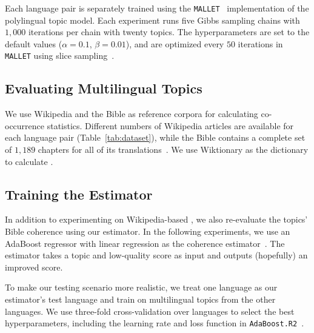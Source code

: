 Each language pair is separately trained using the
\texttt{MALLET}~\cite{McCallumMALLET} implementation of the
polylingual topic model.
Each experiment runs five Gibbs sampling
chains with $1{,}000$ iterations per chain with twenty topics.
The hyperparameters are set to the default values ($\alpha = 0.1$, $\beta = 0.01$),
and are optimized every $50$ iterations in \texttt{MALLET} using slice
sampling~\cite{wallach-09b}.

\subsection{Evaluating Multilingual Topics}

We use Wikipedia and the Bible as reference corpora for calculating
co-occurrence statistics. Different numbers of Wikipedia articles are
available for each language pair (Table~\ref{tab:dataset}), while the
Bible contains a complete set of $1{,}189$ chapters for all of its
translations~\cite{Christodoulopoulos15}. We use Wiktionary as the
dictionary to calculate \mta{}.



\subsection{Training the Estimator}
\label{sec:est-train}


In addition to experimenting on Wikipedia-based \cnpmi{}, we also
re-evaluate the topics' Bible coherence using our estimator.  In the
following experiments, we use an \mbox{AdaBoost} regressor with linear
regression as the coherence estimator~\cite{friedman2002stochastic,CollinsSS00}.
The estimator
takes a topic and low-quality \cnpmi{} score as input and outputs
(hopefully) an improved \cnpmi{} score.

To make our testing scenario more realistic, we treat one language as
our estimator's test language and train on multilingual topics from
the other languages.  We use three-fold cross-validation over
languages to select the best hyperparameters, including the learning
rate and loss function in \texttt{AdaBoost.R2}~\cite{Drucker97}.
